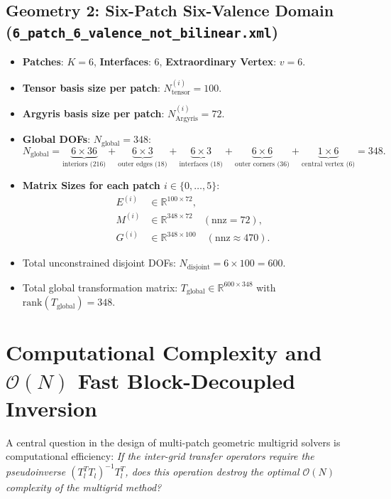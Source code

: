 \documentclass[11pt,a4paper]{article}
\newcommand{\R}{\mathbb{R}}
\begin{document}
\subsection{Geometry 2: Six-Patch Six-Valence Domain (\texttt{6\_patch\_6\_valence\_not\_bilinear.xml})}
\begin{itemize}
    \item \textbf{Patches}: $K = 6$, \textbf{Interfaces}: $6$, \textbf{Extraordinary Vertex}: $v = 6$.
    \item \textbf{Tensor basis size per patch}: $N_{\text{tensor}}^{(i)} = 100$.
    \item \textbf{Argyris basis size per patch}: $N_{\text{Argyris}}^{(i)} = 72$.
    \item \textbf{Global DOFs}: $N_{\text{global}} = 348$:
    \begin{equation}
        N_{\text{global}} = \underbrace{6 \times 36}_{\text{interiors (216)}} + \underbrace{6 \times 3}_{\text{outer edges (18)}} + \underbrace{6 \times 3}_{\text{interfaces (18)}} + \underbrace{6 \times 6}_{\text{outer corners (36)}} + \underbrace{1 \times 6}_{\text{central vertex (6)}} = 348.
    \end{equation}
    \item \textbf{Matrix Sizes for each patch $i \in \{0, \dots, 5\}$}:
    \begin{align}
        E^{(i)} &\in \R^{100 \times 72}, \\
        M^{(i)} &\in \R^{348 \times 72} \quad (\text{nnz} = 72), \\
        G^{(i)} &\in \R^{348 \times 100} \quad (\text{nnz} \approx 470).
    \end{align}
    \item Total unconstrained disjoint DOFs: $N_{\text{disjoint}} = 6 \times 100 = 600$.
    \item Total global transformation matrix: $T_{\text{global}} \in \R^{600 \times 348}$ with $\text{rank}(T_{\text{global}}) = 348$.
\end{itemize}

\newpage
\section{Computational Complexity and \texorpdfstring{$\mathcal{O}(N)$}{O(N)} Fast Block-Decoupled Inversion}

A central question in the design of multi-patch geometric multigrid solvers is computational efficiency: \emph{If the inter-grid transfer operators require the pseudoinverse $(T_l^T T_l)^{-1} T_l^T$, does this operation destroy the optimal $\mathcal{O}(N)$ complexity of the multigrid method?}
\end{document}
